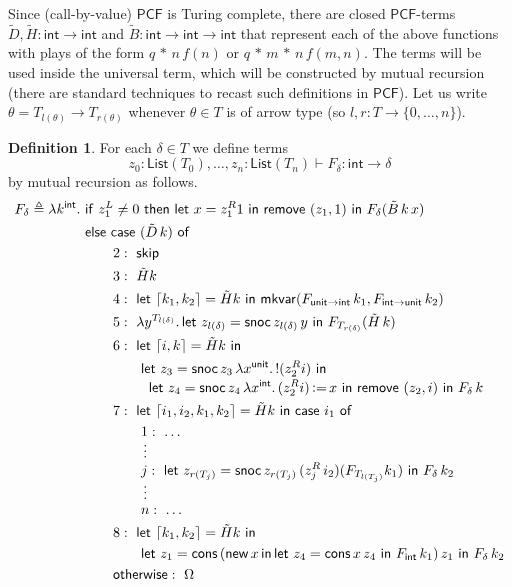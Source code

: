 \documentclass{CSML}
\theoremstyle{definition}\newtheorem{definition}[thm]{Definition}
\theoremstyle{definition}\newtheorem{example}[thm]{Example}
\theoremstyle{definition}\newtheorem{proposition}[thm]{Proposition}
\theoremstyle{definition}\newtheorem{lemma}[thm]{Lemma}
\theoremstyle{definition}\newtheorem{theorem}[thm]{Theorem}
\theoremstyle{definition}\newtheorem{corollary}[thm]{Corollary}
\theoremstyle{definition}\newtheorem{remark}[thm]{Remark}
\newcommand\nt[1]{#1}
\newcommand\defn{\triangleq}
\newcommand\arr{\rightarrow}
\renewcommand\int{\mathsf{int}}
\newcommand\List[1]{\mathsf{List}(#1)}
\newcommand\remove[3]{\mathsf{remove}\ (#1,#2)\ \mathsf{in}\ #3}
\newcommand\Hextend[3]{\mathsf{let}\ #1=\mathsf{cons}\, #2\, #1\ \mathsf{in}\ #3}
\newcommand\Textend[3]{\mathsf{let}\ #1=\mathsf{snoc}\, #1\, #2\ \mathsf{in}\ #3}
\newcommand\code[1]{\lceil#1\rceil}
\newcommand\sskip{\mathsf{skip}}
\newcommand\pcf{\mathsf{PCF}}
\newcommand\letin[2]{\mathsf{let}\ #1\ \mathsf{in}\ #2}
\newcommand\mkvar{\mathsf{mkvar}}
\newcommand{\aasg}{\,\raisebox{0.065ex}{:}{=}\,}
\newcommand\comt{\mathsf{unit}}
\newcommand\new[2]{\mathsf{new}\,#1\,\mathsf{in}\,#2}
\begin{document}
Since (call-by-value) $\pcf$ is Turing complete, there are closed $\pcf$-terms $\tilde D,\tilde H:\int\arr\int$ and $\tilde B:\int\arr\int\arr\int$ that represent each of the above functions with plays of the form \nt{$q\,{*}\,n\,f(n)$} or $q\,{*}\,m\,{*}\,n\,f(m,n)$.
The terms will be used inside the universal term, which will be constructed by mutual recursion (there are standard techniques to recast such definitions in $\pcf$).
Let us write $\theta=T_{l(\theta)}\arr T_{r(\theta)}$ whenever $\theta\in T$ is of arrow type (so $l,r:T\arr\{0,\dots,n\}$).\newpage

\begin{definition}
For each $\delta\in T$ we define  terms 
\[
z_0:\List{T_0},\dots,z_n:\List{T_n}\vdash F_\delta:\int\arr\delta
\]
by mutual recursion as follows.\begin{align*}
  F_\delta \defn \lambda k^\int.\ &\mathsf{if}\ z_{1}^L\neq0\ \mathsf{then}\
  \letin{x=z_1^R1}{\remove{z_1}{1}{F_\delta(\tilde{B}\,k\,x)}}\\
&\mathsf{else}\ \mathsf{case}\ (\tilde{D}\,k)\ \mathsf{of} \\
  &\qquad2:\ \sskip\\
  &\qquad3:\ \tilde{H}k\\
  &\qquad4:\ \letin{\code{k_1,k_2}=\tilde{H}k}{\mkvar(F_{\comt\arr\int}\,k_1,F_{\int\arr\comt}\,k_2)}\\
  &\qquad5:\ \lambda y^{T_{l(\delta)}}.\,\Textend{z_{l(\delta)}}{y}{F_{T_{r(\delta)}}(\tilde{H}\,k)}\\
  &\qquad6:\ \letin{\code{i,k}=\tilde{H}k}{}\\ 
  &\qquad\qquad\Textend{z_3}{\lambda x^\comt.\,!(z_2^Ri)}{}\\[-1mm]
  &\qquad\qquad\;\; \Textend{z_4}{\lambda x^\int.\,(z_2^Ri)\aasg x}{\remove{z_2}{i}{F_\delta\,k}}\\
  &\qquad7:\ \letin{\code{i_1,i_2,k_1,k_2}=\tilde{H}k}{\mathsf{case}\ i_1\ \mathsf{of}}\\
  &\qquad\qquad1:\  \dots \\[-2.5mm]
  &\qquad\qquad\,\vdots \\[-1.5mm]
  &\qquad\qquad j:\ \Textend{z_{r(T_j)}}{(z_{j}^R\,i_2)(F_{T_{l(T_j)}}k_1)}{F_\delta\,k_2}\\[-2.5mm]
  &\qquad\qquad\,\vdots \\[-1.5mm]
  &\qquad\qquad n:\ \dots\\
&\qquad8:\ \letin{\code{k_1,k_2}=\tilde{H}k}{}\\
  &\qquad\qquad\Hextend{z_1}{(\new{x}{\Hextend{z_4}{x}{F_\int\,k_1}})}{F_\delta\,k_2} \\
  &\qquad\mathsf{otherwise}:\ \Omega
\end{align*}
\end{definition}
\end{document}
